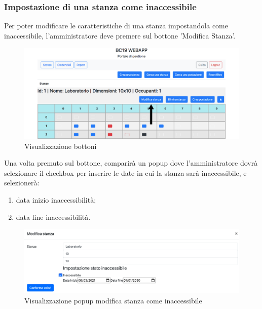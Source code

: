 \subsubsection{Impostazione di una stanza come inaccessibile}
Per poter modificare le caratteristiche di una stanza impostandola come inaccessibile, l'amministratore deve premere sul bottone 'Modifica Stanza'.
\begin{figure}[H]
	\centering
	\includegraphics[width=15cm]{res/images/bottoneEditRoom.png}
	\caption{Visualizzazione bottoni}
\end{figure}
Una volta premuto sul bottone, comparirà un popup dove l'amministratore dovrà selezionare il checkbox per inserire le date in cui la stanza sarà inaccessibile, e selezionerà:
\begin{enumerate}
	\item data inizio inaccessibilità;
	\item data fine inaccessibilità.
\end{enumerate}
\begin{figure}[H]
	\centering
	\includegraphics[width=15cm]{res/images/roomInaccessibile.png}
	\caption{Visualizzazione popup modifica stanza come inaccessibile}
\end{figure}

